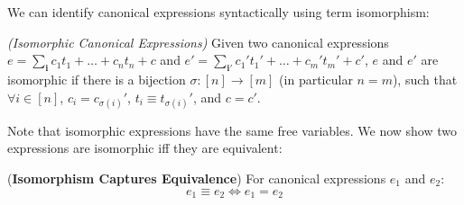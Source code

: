 \documentclass{article}
\begin{document}
We can identify canonical expressions syntactically using term isomorphism: 

\begin{definition}{\em (Isomorphic Canonical Expressions)} 
Given two canonical expressions $e = \sum_{\pmb{i}} c_1 t_1 + \dots + c_n t_n + c $ and $e' = \sum_{\pmb{i'}} c_1' t_1' + \dots + c_m' t_m' + c'$, $e$ and $e'$ are isomorphic if there is a bijection $\sigma: [n] \rightarrow [m]$ (in particular $n=m$), such that $\forall i \in [n]$, 
     $c_i = c_{\sigma(i)}'$, 
     $t_i \equiv t_{\sigma(i)}'$, and 
     $c = c'$. 
\end{definition}{}

Note that isomorphic expressions have the same free variables. We now show two expressions are isomorphic iff they are equivalent: 

\begin{theorem}{(\textbf{Isomorphism Captures Equivalence})} For canonical expressions $e_1$ and $e_2$: 
$$e_1 \equiv e_2 \iff e_1 = e_2$$ 
\end{theorem}{}
\end{document}
